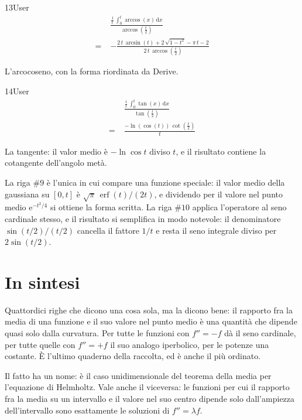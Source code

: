 \begin{espr}{13}{User}{\verificata}
\begin{align*}
& \frac{\frac{1}{t}\, \int_{0}^{t} \arccos\!\left(x\right) \,\mathrm{d}x}{\arccos\!\left(\frac{t}{2}\right)} \\
=\;& -\frac{2\, t\, \arcsin\!\left(t\right) + 2\, \sqrt{1 - t^{2}} - \pi\, t - 2}{2\, t\, \arccos\!\left(\frac{t}{2}\right)}
\end{align*}
\end{espr}
L'arcocoseno, con la forma riordinata da Derive.

\begin{espr}{14}{User}{\verificata}
\begin{align*}
& \frac{\frac{1}{t}\, \int_{0}^{t} \tan\!\left(x\right) \,\mathrm{d}x}{\tan\!\left(\frac{t}{2}\right)} \\
=\;& \frac{-\ln\!\left(\cos\!\left(t\right)\right)\, \cot\!\left(\frac{t}{2}\right)}{t}
\end{align*}
\end{espr}
La tangente: il valor medio è $-\ln\cos t$ diviso $t$, e il risultato contiene la cotangente dell'angolo metà.


La riga $\#9$ è l'unica in cui compare una funzione speciale: il valor medio della gaussiana su $[0,t]$ è $\sqrt\pi\,\operatorname{erf}(t)/(2t)$, e dividendo per il valore nel punto medio $\mathrm{e}^{-t^2/4}$ si ottiene la forma scritta. La riga $\#10$ applica l'operatore al seno cardinale stesso, e il risultato si semplifica in modo notevole: il denominatore $\sin(t/2)/(t/2)$ cancella il fattore $1/t$ e resta il seno integrale diviso per $2\sin(t/2)$.

\section*{In sintesi}

Quattordici righe che dicono una cosa sola, ma la dicono bene: il rapporto fra la media di una funzione e il suo valore nel punto medio è una quantità che dipende quasi solo dalla curvatura. Per tutte le funzioni con $f''=-f$ dà il seno cardinale, per tutte quelle con $f''=+f$ il suo analogo iperbolico, per le potenze una costante. È l'ultimo quaderno della raccolta, ed è anche il più ordinato.

Il fatto ha un nome: è il caso unidimensionale del teorema della media per l'equazione di Helmholtz. Vale anche il viceversa: le funzioni per cui il rapporto fra la media su un intervallo e il valore nel suo centro dipende solo dall'ampiezza dell'intervallo sono esattamente le soluzioni di $f''=\lambda f$.

